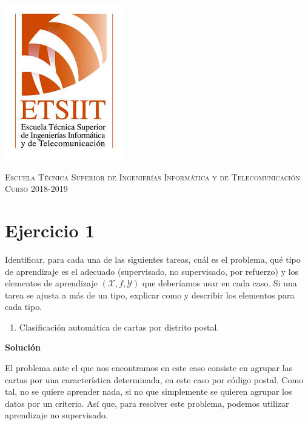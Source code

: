 \documentclass[11pt,a4paper]{article}
\newcommand{\answer}{\noindent\textbf{Solución}}
\begin{document}
\begin{titlepage}
\begin{minipage}{\textwidth}
\includegraphics[scale=0.3]{img/etsiit.jpeg}

\vspace{0.7cm}
\textsc{Escuela Técnica Superior de Ingenierías Informática y de Telecomunicación}\\
\vspace{1cm}
\textsc{Curso 2018-2019}
\end{minipage}
\end{titlepage}

\tableofcontents
\thispagestyle{empty}				%

\newpage

\setlength{\parskip}{1em}

\section*{Ejercicio 1}

\noindent Identificar, para cada una de las siguientes tareas, cuál es el problema, qué tipo de aprendizaje es el adecuado
(supervisado, no supervisado, por refuerzo) y los elementos de aprendizaje $(\mathcal{X} , f, \mathcal{Y})$ que deberíamos
usar en cada caso. Si una tarea se ajusta a más de un tipo, explicar como y describir los elementos para cada tipo.

\begin{enumerate}[label=\textit{\alph*})]
	\item Clasificación automática de cartas por distrito postal.
\end{enumerate}

\answer

El problema ante el que nos encontramos en este caso consiste en agrupar las cartas por una característica determinada,
en este caso por código postal. Como tal, no se quiere aprender nada, si no que simplemente se quieren agrupar los datos
por un criterio. Así que, para resolver este problema, podemos utilizar aprendizaje no supervisado.
\end{document}
